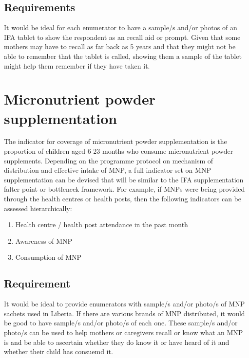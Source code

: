 \documentclass[12pt,a4paper]{book}
\theoremstyle{definition}
\theoremstyle{definition}
\theoremstyle{definition}
\theoremstyle{remark}
\begin{document}
\hypertarget{requirements-2}{%
\subsection{Requirements}\label{requirements-2}}

It would be ideal for each enumerator to have a sample/s and/or photos
of an IFA tablet to show the respondent as an recall aid or prompt.
Given that some mothers may have to recall as far back as 5 years and
that they might not be able to remember that the tablet is called,
showing them a sample of the tablet might help them remember if they
have taken it.

\hypertarget{micronutrient-powder-supplementation}{%
\section{Micronutrient powder
supplementation}\label{micronutrient-powder-supplementation}}

The indicator for coverage of micronutrient powder supplementation is
the proportion of children aged 6-23 months who consume micronutrient
powder supplements. Depending on the programme protocol on mechanism of
distribution and effective intake of MNP, a full indicator set on MNP
supplementation can be devised that will be similar to the IFA
supplementation falter point or bottleneck framework. For example, if
MNPs were being provided through the health centres or health posts,
then the following indicators can be assessed hierarchically:

\begin{enumerate}
\def\labelenumi{\arabic{enumi}.}
\item
  Health centre / health post attendance in the past month
\item
  Awareness of MNP
\item
  Consumption of MNP
\end{enumerate}

\hypertarget{requirement}{%
\subsection{Requirement}\label{requirement}}

It would be ideal to provide enumerators with sample/s and/or photo/s of
MNP sachets used in Liberia. If there are various brands of MNP
distributed, it would be good to have sample/s and/or photo/s of each
one. These sample/s and/or photo/s can be used to help mothers or
caregivers recall or know what an MNP is and be able to ascertain
whether they do know it or have heard of it and whether their child has
consuemd it.
\end{document}
